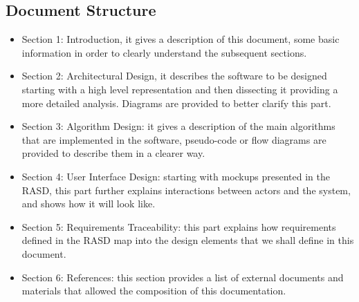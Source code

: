 \subsection{Document Structure}
\begin{itemize}
	\item Section 1: Introduction, it gives a description of this document, some basic information in order to clearly understand the subsequent sections.
	\item Section 2: Architectural Design, it describes the software to be designed starting with a high level representation and then dissecting it providing a more detailed analysis. Diagrams are provided to better clarify this part.
	\item Section 3: Algorithm Design: it gives a description of the main algorithms that are implemented in the software, pseudo-code or flow diagrams are provided to describe them in a clearer way.
	\item Section 4: User Interface Design: starting with mockups presented in the RASD, this part further explains interactions between actors and the system, and shows how it will look like.
	\item Section 5: Requirements Traceability: this part explains how requirements defined in the RASD map into the design elements that we shall define in this document.
	\item Section 6: References: this section provides a list of external documents and materials that allowed the composition of this documentation.
\end{itemize}
